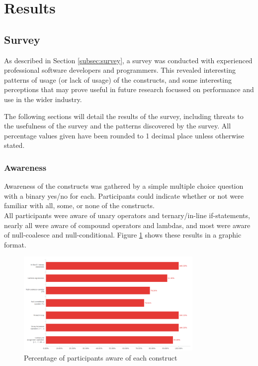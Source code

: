 \documentclass{article}
\begin{document}
\newpage
\section{Results}
    \subsection{Survey}
    \label{subsec:results}
        As described in Section \ref{subsec:survey}, a survey was conducted with experienced professional software developers and programmers. This revealed interesting patterns of usage (or lack of usage) of the constructs, and some interesting perceptions that may prove useful in future research focussed on performance and use in the wider industry.

        The following sections will detail the results of the survey, including threats to the usefulness of the survey and the patterns discovered by the survey. All percentage values given have been rounded to 1 decimal place unless otherwise stated.
        \subsubsection{Awareness}
            Awareness of the constructs was gathered by a simple multiple choice question with a binary yes/no for each. Participants could indicate whether or not were familiar with all, some, or none of the constructs.
            \\\newline
            All participants were aware of unary operators and ternary/in-line if-statements, nearly all were aware of compound operators and lambdas, and most were aware of null-coalesce and null-conditional. Figure \ref{fig:awareness} shows these results in a graphic format.

            \begin{figure}[htbp]
                \centering
                \includegraphics[width=0.8\textwidth]{awareness}
                \caption{Percentage of participants aware of each construct}
                \label{fig:awareness}
            \end{figure}
\end{document}
